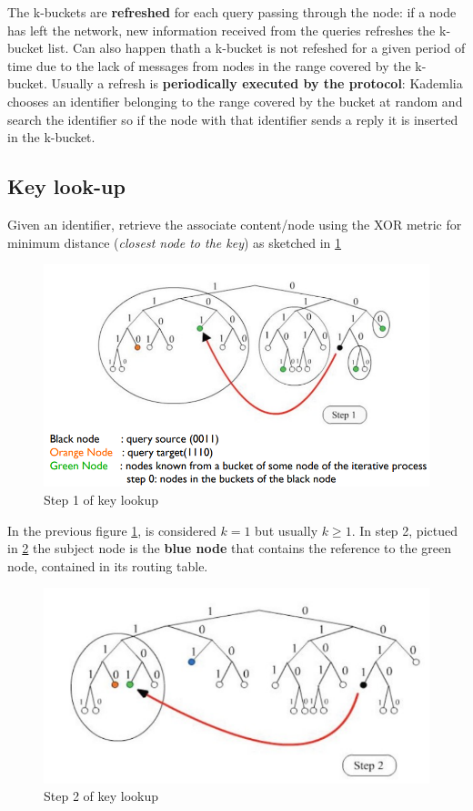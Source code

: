 \documentclass[10pt,a4paper]{report}
\begin{document}
The k-buckets are \textbf{refreshed} for each query passing through the node: if a node has left the network, new information received from the queries refreshes the k-bucket list.
Can also happen thath a k-bucket is not refeshed for a given period of time due to the lack of messages from nodes in the range covered by the k-bucket.
Usually a refresh is \textbf{periodically executed by the protocol}: Kademlia chooses an identifier belonging to the range covered by the bucket at random and search the identifier so if the node with that identifier sends a reply it is inserted in the k-bucket.



\subsection{Key look-up}\label{sec:key-look-up}
Given an identifier, retrieve the associate content/node using the XOR metric for minimum distance (\textit{closest node to the key}) as sketched in \ref{kademlia-lookup}
\begin{figure}[h]
	\centering
	\includegraphics[scale=0.45]{images/Pasted image 20230308112052.png}
	\caption{Step 1 of key lookup}
\label{kademlia-lookup}
\end{figure}

In the previous figure \ref{kademlia-lookup}, is considered $k = 1$ but usually $k \ge 1$.
In step 2, pictued in \ref{kademlia-lookup2} the subject node is the \textbf{blue node} that contains the reference to the green node, contained in its routing table.
\begin{figure}[h]
	\centering
	\includegraphics[scale=0.60]{images/Pasted image 20230308112246.png}
	\caption{Step 2 of key lookup}
	\label{kademlia-lookup2}
\end{figure}
\end{document}

